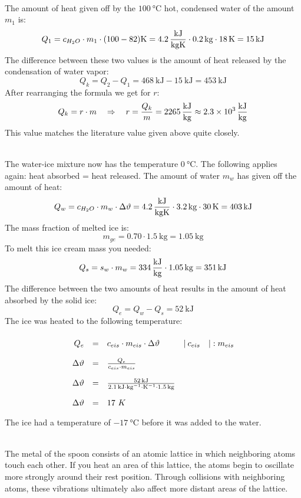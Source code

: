 \documentclass[a4paper]{article}
\begin{document}
	\\
	The amount of heat given off by the $\SI{100}{\celsius}$ hot, condensed water of the amount $m_1$ is:
	$$Q_1=c_{H_2O}\cdot m_1 \cdot (100-82)\SI{}{\kelvin} = \SI{4,2}{\kilo\joule\over \kilogram\kelvin}\cdot \SI {0.2}{\kilogram} \cdot \SI{18}{\kelvin} = \SI{15}{\kilo\joule}$$
	The difference between these two values is the amount of heat released by the condensation of water vapor:
	$$Q_k= Q_2-Q_1=\SI{468}{\kilo\joule}-\SI{15}{\kilo\joule}=\SI{453}{\kilo\joule}$$
	After rearranging the formula we get for $r$:
	$$Q_k = r\cdot m \quad \Rightarrow\quad r= {Q_k \over m} =\SI{2265}{\kilo\joule\over \kilogram} \approx \SI{2,3e3}{\kilo\joule\over \kilogram} $$
	This value matches the literature value given above quite closely.
	\vspace{0.5 cm}
	
	\\
	The water-ice mixture now has the temperature $\SI{0}{\celsius}$. The following applies again: heat absorbed = heat released. The amount of water $m_w$ has given off the amount of heat:
	$$Q_w = c_{H_2O}\cdot m_w \cdot \Delta \vartheta =\SI{4,2}{\kilo\joule\over \kilogram\kelvin} \cdot \SI{3,2}{\kilogram} \cdot \SI{30}{\kelvin} = \SI{403}{\kilo\joule}$$
	The mass fraction of melted ice is:
	$$m_{ge}=0.70 \cdot \SI{1.5}{\kilogram}= \SI{1.05}{\kilogram}$$
	To melt this ice cream mass you needed:
	$$Q_s=s_w \cdot m_w = \SI{334}{\kilo\joule\over \kilogram} \cdot \SI{1.05}{\kilogram}=\SI{351}{\kilo\joule}$$
	The difference between the two amounts of heat results in the amount of heat absorbed by the solid ice:
	$$Q_e = Q_w-Q_s=\SI{52}{\kilo\joule}$$
	The ice was heated to the following temperature:
	$$
	\renewcommand{\arraystretch}{2}
	\begin{array}{rcll}
		Q_e &=& c_{eis}\cdot m_{eis}\cdot \Delta \vartheta &|\: c_{eis} \quad |: m_{eis}\\
		\Delta \vartheta &=& {Q_e \over c_{eis}\cdot m_{eis}}\\
		\Delta \vartheta &=& {\SI{52}{\kilo\joule}\over \SI{2,1}{\kilo\joule\cdot \kilogram^{-1}\cdot \kelvin^{-1 }}\cdot \SI{1.5}{\kilogram}}\\
		\Delta \vartheta &=& 17~K
	\end{array}
	$$
	The ice had a temperature of $\SI{-17}{\celsius}$ before it was added to the water.
	\vspace{0.5 cm}
	
	\\
	The metal of the spoon consists of an atomic lattice in which neighboring atoms touch each other. If you heat an area of this lattice, the atoms begin to oscillate more strongly around their rest position. Through collisions with neighboring atoms, these vibrations ultimately also affect more distant areas of the lattice.
	\vspace{0.5 cm}
	
\end{document}
